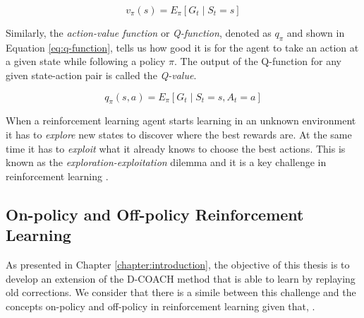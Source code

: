 \begin{equation}
v_\pi \left(s\right) = E_\pi \left[G_{t}\mid S_{t}=s\right]
\label{eq:value-function}
\end{equation}



Similarly, the \textit{action-value function} or \textit{Q-function}, denoted as $q_\pi$ and shown in Equation \eqref{eq:q-function}, tells us how good it is for the agent to take an action at a given state while following a policy $\pi$. The output of the Q-function for any given state-action pair is called the \textit{Q-value}. 

\begin{equation}
q_\pi \left( s,a \right) = E_\pi \left[ G_{t}\mid S_{t}=s,A_{t}=a \right] 
\label{eq:q-function}
\end{equation}




When a reinforcement learning agent starts learning in an unknown environment it has to \textit{explore} new states to discover where the best rewards are. At the same time it has to \textit{exploit} what it already knows to choose the best actions. This is known as the \textit{exploration-exploitation }dilemma and it is a key challenge in reinforcement learning \cite{Sutton:1998}.




\subsection{On-policy and Off-policy Reinforcement Learning}
\label{subsection:on and off-policy Reinforcement Learning}

As presented in Chapter \ref{chapter:introduction}, the objective of this thesis is to develop an extension of the D-COACH method that is able to learn by replaying old corrections. We consider that there is a simile between this challenge and the concepts on-policy and off-policy in reinforcement learning given that,  \cite{Atari-RL}.


